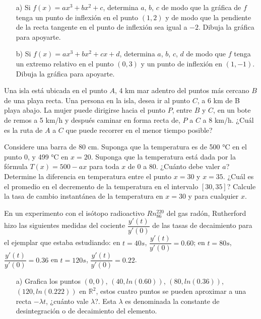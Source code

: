 \documentclass[10pt]{exam}
\begin{document}
\begin{questions}

\question \begin{itemize}
    \item [a)] Si $f(x)=ax^3+bx^2+c$, determina $a$, $b$, $c$ de modo que la gráfica de $f$ tenga un punto de inflexión en el punto $(1,2)$ y de modo que la pendiente de la recta tangente en el punto de inflexión sea igual a $-2$. Dibuja la gráfica para apoyarte.
    \item [b)] Si $f(x)=ax^3+bx^2+cx+d$, determina $a$, $b$, $c$, $d$ de modo que $f$ tenga un extremo relativo en el punto $(0,3)$ y un punto de inflexión en $(1,-1)$. Dibuja la gráfica para apoyarte.
\end{itemize}


\question Una isla está ubicada en el punto $A$, 4 km mar adentro del puntos más cercano $B$ de una playa recta. Una persona en la isla, desea ir al punto $C$, a 6 km de B playa abajo. La mujer puede dirigirse hacia el punto $P$, entre $B$ y $C$, en un bote de remos a 5 km/h y después caminar en forma recta de, $P$ a $C$ a 8 km/h. ¿Cuál es la ruta de $A$ a $C$ que puede recorrer en el menor tiempo posible?

\question Considere una barra de 80 cm. Suponga que la temperatura es de 500 °C en el punto 0, y 499 °C en $x = 20$. Suponga que la temperatura está dada por la fórmula $T(x) = 500-ax$ para toda $x$ de 0 a 80. ¿Cuánto debe valer $a$? Determine la diferencia en temperatura entre el punto $x = 30$ y $x = 35$. ¿Cuál es el promedio en el decremento de la temperatura en el intervalo $[30,35]$? Calcule la tasa de cambio instantánea de la temperatura en $x = 30$ y para cualquier $x$.

\question En un experimento con el isótopo radioactivo $Rn^{220}_{86}$ del gas radón, Rutherford hizo las siguientes medidas del cociente $\dfrac{y'(t)}{y'(0)}$ de las tasas de decaimiento para el ejemplar que estaba estudiando: en $t = 40s$, $\dfrac{y'(t)}{y'(0)}=0.60$; en $t = 80s$, $\dfrac{y'(t)}{y'(0)}=0.36$ en $t = 120s$, $\dfrac{y'(t)}{y'(0)}=0.22$.
\begin{itemize}
    \item [a)] Grafica los puntos $(0,0)$, $(40, ln (0.60))$, $(80, ln( 0.36))$, $(120, ln (0.222))$ en $\mathbb{R}^{2}$, estos cuatro puntos se pueden aproximar a una recta $-\lambda t$, ¿cuánto vale $\lambda$?.
    Esta $\lambda$ es denominada la constante de desintegración o de decaimiento del elemento. 


\end{itemize}
\end{questions}
\end{document}
